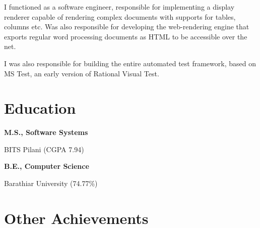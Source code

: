 \documentclass[a4paper,12pt]{article}
\newcommand\cveducation[4]{

  \normalfont\bf{#1, #2}

  \normalfont\small{#3 (#4)}
}
\begin{document}
I functioned as a software engineer, responsible for implementing a
display renderer capable of rendering complex documents with supports
for tables, columns etc. Was also responsible for developing the
web-rendering engine that exports regular word processing documents as
HTML to be accessible over the net.
 
I was also responsible for building the entire automated test
framework, based on MS Test, an early version of Rational Visual Test.

\section*{Education}

\cveducation{M.S.}{Software Systems}{BITS Pilani}{CGPA 7.94}
\cveducation{B.E.}{Computer Science}{Barathiar University}{74.77\%}

\section*{Other Achievements}
\end{document}
